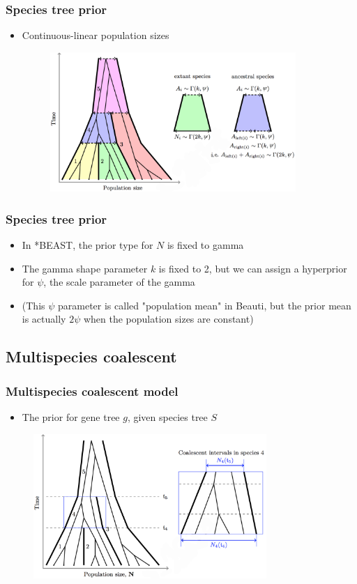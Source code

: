 \begin{frame}\frametitle{Species tree prior}
	\begin{itemize}
		\item Continuous-linear population sizes
		\begin{figure}[h!]
 			\includegraphics[height=5.3cm]{figures/popFunctionLinear}
		\end{figure}
	\end{itemize}
\end{frame}

\begin{frame}\frametitle{Species tree prior}
	\begin{itemize}
		\item In *BEAST, the prior type for $N$ is fixed to gamma
		\item The gamma shape parameter $k$ is fixed to 2, but we can assign a hyperprior for $\psi$, the scale parameter of the gamma
		\item (This $\psi$ parameter is called "population mean" in Beauti, but the prior mean is actually $2\psi$ when the population sizes are constant) 
	\end{itemize}
\end{frame}

\subsection{Multispecies coalescent}

\begin{frame}\frametitle{Multispecies coalescent model}
	\begin{itemize}
		\item The prior for gene tree $g$, given species tree $S$
	\end{itemize}
	\begin{figure}[h!]
 		\includegraphics[height=5.5cm]{figures/mscOverview}
	\end{figure}
\end{frame}

